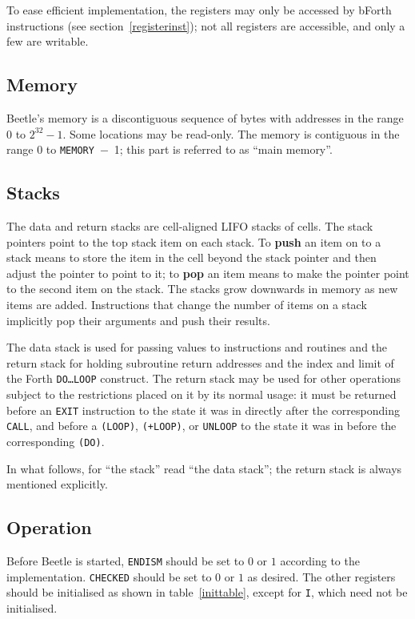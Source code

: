 \documentclass{article}
\begin{document}
To ease efficient implementation, the registers may only be accessed
by bForth instructions (see section~\ref{registerinst}); not all registers are accessible, and only a few are writable.


\subsection{Memory}

Beetle's memory is a discontiguous sequence of bytes with addresses in the range $0$ to $2^{32}-1$. Some locations may be read-only. The memory is contiguous in the range $0$ to {\tt MEMORY}~$-$~1; this part is referred to as ``main memory''.

\subsection{Stacks}

The data and return stacks are cell-aligned LIFO stacks of cells. The stack
pointers point to the top stack item on each stack. To {\bf push} an item on to
a stack means to store the item in the cell beyond the stack pointer and then
adjust the pointer to point to it; to {\bf pop} an item means to make the
pointer point to the second item on the stack. The stacks grow downwards in
memory as new items are added. Instructions that change the number of items on a
stack implicitly pop their arguments and push their results.

The data stack is used for passing values to instructions and routines and the
return stack for holding subroutine return addresses and the index and limit of
the Forth {\tt DO\dots LOOP} construct. The return stack may be used for other
operations subject to the restrictions placed on it by its normal usage: it must
be returned before an {\tt EXIT} instruction to the state it was in directly
after the corresponding {\tt CALL}, and before a {\tt (LOOP)}, {\tt (+LOOP)}, or
{\tt UNLOOP} to the state it was in before the corresponding {\tt (DO)}.

In what follows, for ``the stack'' read ``the data stack''; the return stack is
always mentioned explicitly.


\subsection{Operation}
\label{operation}

Before Beetle is started, {\tt ENDISM} should be set to $0$ or $1$ according to the implementation. {\tt CHECKED} should be set to $0$ or $1$ as desired. The other registers should be initialised as shown in table~\ref{inittable}, except for {\tt I}, which need not be initialised.
\end{document}
